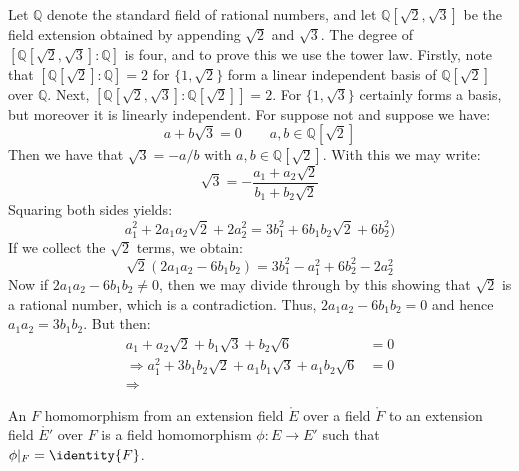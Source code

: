     \begin{example}
        Let $\mathbb{Q}$ denote the standard field of rational numbers, and
        let $\mathbb{Q}[\sqrt{2},\sqrt{3}]$ be the field extension obtained
        by appending $\sqrt{2}$ and $\sqrt{3}$. The degree of
        $[\mathbb{Q}[\sqrt{2},\sqrt{3}]:\mathbb{Q}]$ is four, and to prove
        this we use the tower law. Firstly, note that
        $[\mathbb{Q}[\sqrt{2}]:\mathbb{Q}]=2$ for $\{1,\sqrt{2}\}$ form a
        linear independent basis of $\mathbb{Q}[\sqrt{2}]$ over
        $\mathbb{Q}$. Next,
        $[\mathbb{Q}[\sqrt{2},\sqrt{3}]:\mathbb{Q}[\sqrt{2}]]=2$. For
        $\{1,\sqrt{3}\}$ certainly forms a basis, but moreover it is
        linearly independent. For suppose not and suppose we have:
        \begin{equation}
            a+b\sqrt{3}=0\quad\quad
            a,b\in\mathbb{Q}[\sqrt{2}]
        \end{equation}
        Then we have that $\sqrt{3}=\minus{a}/b$ with
        $a,b\in\mathbb{Q}[\sqrt{2}]$. With this we may write:
        \begin{equation}
            \sqrt{3}=\minus\frac{a_{1}+a_{2}\sqrt{2}}{b_{1}+b_{2}\sqrt{2}}
        \end{equation}
        Squaring both sides yields:
        \begin{equation}
            a_{1}^{2}+2a_{1}a_{2}\sqrt{2}+2a_{2}^{2}=
            3b_{1}^{2}+6b_{1}b_{2}\sqrt{2}+6b_{2}^{2})
        \end{equation}
        If we collect the $\sqrt{2}$ terms, we obtain:
        \begin{equation}
            \sqrt{2}(2a_{1}a_{2}-6b_{1}b_{2})=
            3b_{1}^{2}-a_{1}^{2}+6b_{2}^{2}-2a_{2}^{2}
        \end{equation}
        Now if $2a_{1}a_{2}-6b_{1}b_{2}\ne{0}$, then we may divide through
        by this showing that $\sqrt{2}$ is a rational number, which is a
        contradiction. Thus, $2a_{1}a_{2}-6b_{1}b_{2}=0$ and hence
        $a_{1}a_{2}=3b_{1}b_{2}$. But then:
        \begin{align}
            a_{1}+a_{2}\sqrt{2}+b_{1}\sqrt{3}+b_{2}\sqrt{6}&=0\\
            \Rightarrow
            a_{1}^{2}+3b_{1}b_{2}\sqrt{2}
                +a_{1}b_{1}\sqrt{3}+a_{1}b_{2}\sqrt{6}&=0\\
            \Rightarrow
        \end{align}
    \end{example}
    \begin{definition}
        An $F$ homomorphism from an extension field $\ring{E}$ over a field
        $\ring{F}$ to an extension field $\ring{E'}$  over $F$ is a field
        homomorphism $\phi:E\rightarrow{E}'$ such that
        $\phi|_{F}=\identity{F}$.
    \end{definition}
